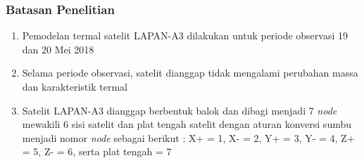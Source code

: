 \documentclass[8pt]{beamer}
\begin{document}
\begin{frame}
  \frametitle{Batasan Penelitian}
  \begin{enumerate}
    \item Pemodelan termal satelit LAPAN-A3 dilakukan untuk periode observasi 19 dan 20 Mei 2018
    \item Selama periode observasi, satelit dianggap tidak mengalami perubahan massa dan karakteristik termal
    \item Satelit LAPAN-A3 dianggap berbentuk balok dan dibagi menjadi 7
	\textit{node} mewakili 6 sisi satelit dan plat tengah satelit dengan aturan
		konversi sumbu menjadi nomor \textit{node} sebagai berikut : X+ = 1, X- =
		2, Y+ = 3, Y- = 4, Z+ = 5, Z- = 6, serta plat tengah = 7
  \end{enumerate}
\end{frame}
\end{document}
